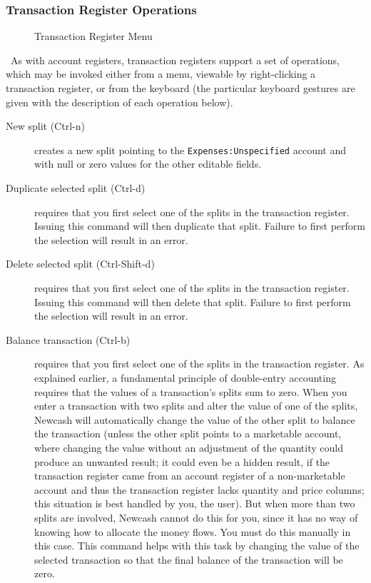 \documentclass{report}
\newcommand{\graphicsfig}[5]{
\begin{figure}[#5]
\begin{center}
\resizebox{#1}{!}{\texttt{[image: \#2]}}
\end{center}
\caption{#3}
\label{#4}
\end{figure}
}
\begin{document}
\subsubsection{Transaction Register Operations}
\label{Transaction Register Operations}
\graphicsfig{5in}{figures/transaction_register_menu.png}{Transaction Register Menu}{Transaction Register Menu}{}
\
As with account registers, transaction registers support a set of operations, which may be invoked either from a menu, viewable by right-clicking a transaction register, or from the keyboard (the particular keyboard gestures are given with the description of each operation below).
\begin{description}
\item [New split (Ctrl-n)] creates a new split pointing to the \verb|Expenses:Unspecified| account and with null or zero values for the other editable fields.
\item [Duplicate selected split (Ctrl-d)] requires that you first select one of the splits in the transaction register. Issuing this command will then duplicate that split. Failure to first perform the selection will result in an error.
\item [Delete selected split (Ctrl-Shift-d)] requires that you first select one of the splits in the transaction register. Issuing this command will then delete that split. Failure to first perform the selection will result in an error.
\item [Balance transaction (Ctrl-b)]  requires that you first select one of the splits in the transaction register. As explained earlier, a fundamental principle of double-entry accounting requires that the values of a transaction's splits sum to zero. When you enter a transaction with two splits and alter the value of one of the splits, Newcash will automatically change the value of the other split to balance the transaction (unless the other split points to a marketable account, where changing the value without an adjustment of the quantity could produce an unwanted result; it could even be a hidden result, if the transaction register came from an account register of a non-marketable account and thus the transaction register lacks quantity and price columns; this situation is best handled by you, the user). But when more than two splits are involved, Newcash cannot do this for you, since it has no way of knowing how to allocate the money flows. You must do this manually in this case. This command helps with this task by changing the value of the selected transaction so that the final balance of the transaction will be zero.

\end{description}
\end{document}
